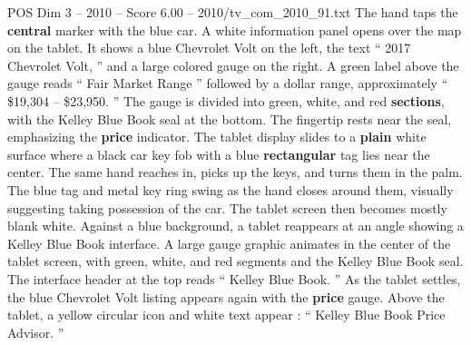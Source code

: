 \begin{textsample}{POS Dim 3 – 2010 – Score 6.00 – 2010/tv\_com\_2010\_91.txt}
The hand taps the \textbf{central} marker with the blue car.
A white information panel opens over the map on the tablet.
It shows a blue Chevrolet Volt on the left, the text “ 2017 Chevrolet Volt, ” and a large colored gauge on the right.
A green label above the gauge reads “ Fair Market Range ” followed by a dollar range, approximately “ \$19,304 – \$23,950. ” The gauge is divided into green, white, and red \textbf{sections}, with the Kelley Blue Book seal at the bottom.
The fingertip rests near the seal, emphasizing the \textbf{price} indicator.
The tablet display slides to a \textbf{plain} white surface where a black car key fob with a blue \textbf{rectangular} tag lies near the center.
The same hand reaches in, picks up the keys, and turns them in the palm.
The blue tag and metal key ring swing as the hand closes around them, visually suggesting taking possession of the car.
The tablet screen then becomes mostly blank white.
Against a blue background, a tablet reappears at an angle showing a Kelley Blue Book interface.
A large gauge graphic animates in the center of the tablet screen, with green, white, and red segments and the Kelley Blue Book seal.
The interface header at the top reads “ Kelley Blue Book. ” As the tablet settles, the blue Chevrolet Volt listing appears again with the \textbf{price} gauge.
Above the tablet, a yellow circular icon and white text appear : “ Kelley Blue Book Price Advisor. ”

\end{textsample}
